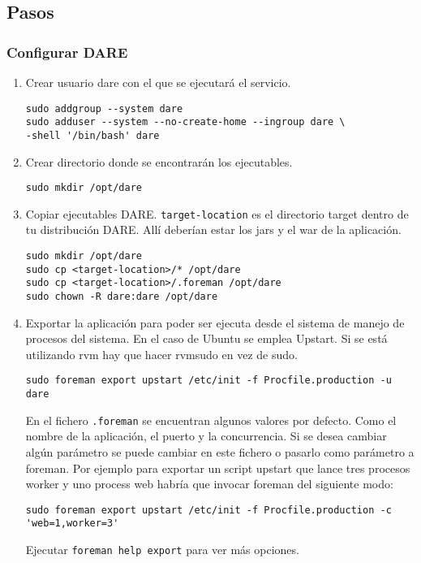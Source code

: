 \subsection{Pasos}

\subsubsection{Configurar DARE}
\begin{enumerate}
  \item Crear usuario dare con el que se ejecutará el servicio.
    \begin{verbatim}
sudo addgroup --system dare
sudo adduser --system --no-create-home --ingroup dare \
-shell '/bin/bash' dare
    \end{verbatim}
  \item Crear directorio donde se encontrarán los ejecutables.
    \begin{verbatim}
sudo mkdir /opt/dare
    \end{verbatim}
  \item Copiar ejecutables DARE. \verb+target-location+ es el
    directorio target dentro de tu distribución DARE. Allí deberían
    estar los jars y el war de la aplicación.
    \begin{verbatim}
sudo mkdir /opt/dare
sudo cp <target-location>/* /opt/dare
sudo cp <target-location>/.foreman /opt/dare
sudo chown -R dare:dare /opt/dare
    \end{verbatim}

  \item Exportar la aplicación para poder ser ejecuta desde el sistema
    de manejo de procesos del sistema. En el caso de Ubuntu se emplea
    Upstart\cite{UPSTART}. Si se está utilizando rvm hay que hacer
    rvmsudo en vez de sudo.

    \verb+sudo foreman export upstart /etc/init -f Procfile.production -u dare+

    En el fichero \verb+.foreman+ se encuentran algunos valores por
    defecto. Como el nombre de la aplicación, el puerto y la
    concurrencia. Si se desea cambiar algún parámetro se puede cambiar
    en este fichero o pasarlo como parámetro a foreman. Por ejemplo
    para exportar un script upstart que lance tres procesos worker y
    uno process web habría que invocar foreman del siguiente modo:

    \begin{verbatim}
sudo foreman export upstart /etc/init -f Procfile.production -c 'web=1,worker=3'
    \end{verbatim}
    Ejecutar \verb+foreman help export+ para ver más opciones.
\end{enumerate}

